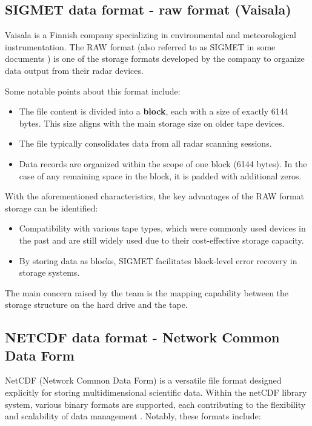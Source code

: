 \subsection{SIGMET data format - raw format (Vaisala)}
\label{sigmet}
Vaisala is a Finnish company specializing in environmental and meteorological
instrumentation. The RAW format (also referred to as SIGMET in some documents
\cite{lrose_RadxConvert}) is one of the storage formats developed by the company
to organize data output from their radar devices.

Some notable points about this format include:

\begin{itemize}
    \item The file content is divided into a \textbf{block}, each with a size of
    exactly 6144 bytes. This size aligns with the main storage size on older
    tape devices.
    \item The file typically consolidates data from all radar scanning sessions.
    \item Data records are organized within the scope of one block (6144 bytes).
    In the case of any remaining space in the block, it is padded with
    additional zeros.
\end{itemize}

With the aforementioned characteristics, the key advantages of the RAW format
storage can be identified: \cite{raw_product_format_vaisala}

\begin{itemize}
    \item Compatibility with various tape types, which were commonly used
    devices in the past and are still widely used due to their cost-effective
    storage capacity.
    \item By storing data as blocks, SIGMET facilitates block-level error
    recovery in storage systems.
\end{itemize}

The main concern raised by the team is the mapping capability between the
storage structure on the hard drive and the tape.

\subsection{NETCDF data format - Network Common Data Form}

NetCDF (Network Common Data Form) is a versatile file format designed explicitly
for storing multidimensional scientific data. Within the netCDF library system,
various binary formats are supported, each contributing to the flexibility and
scalability of data management \cite{netcdf}. Notably, these formats include:

